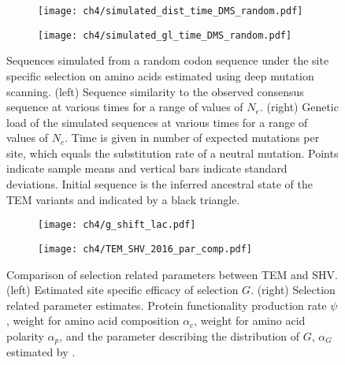 \begin{figure}[h]
    \centering
    \begin{subfigure}
        \centering
        \texttt{[image: ch4/simulated\_dist\_time\_DMS\_random.pdf]}
    \end{subfigure}
    \begin{subfigure}
        \centering
        \texttt{[image: ch4/simulated\_gl\_time\_DMS\_random.pdf]}
    \end{subfigure}
    \caption{Sequences simulated from a random codon sequence under the site specific selection on amino acids estimated using deep mutation scanning. 
    (left) Sequence similarity to the observed consensus sequence at various times for a range of values of $N_e$.
    (right) Genetic load of the simulated sequences at various times for a range of values of $N_e$.
    Time is given in number of expected mutations per site, which equals the substitution rate of a neutral mutation.
    Points indicate sample means and vertical bars indicate standard deviations. Initial sequence is the inferred ancestral state of the TEM variants and indicated by a black triangle.}
    \label{fig:dms_sim_rand}
\end{figure}
\null
\vfill
\clearpage
\null
\vfill
\begin{figure}[h]
    \centering
    \begin{subfigure}
        \centering
        \texttt{[image: ch4/g\_shift\_lac.pdf]}
    \end{subfigure}
    \begin{subfigure}
        \centering
        \texttt{[image: ch4/TEM\_SHV\_2016\_par\_comp.pdf]}
    \end{subfigure}
    \caption{Comparison of selection related parameters between TEM and SHV. 
    (left) Estimated site specific efficacy of selection $G$. 
    (right) Selection related parameter estimates. 
    Protein functionality production rate $\psi$, \PC weight for amino acid composition $\alpha_c$, \PC weight for amino acid polarity $\alpha_p$, and the parameter describing the distribution of $G$, $\alpha_G$ estimated by \selac.}
    \label{fig:tem_shv_param_comp}
\end{figure}
\null
\vfill
\doublespacing